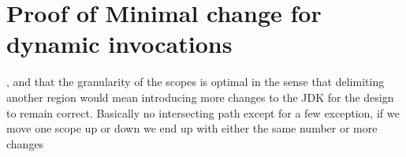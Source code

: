 \chapter{Proof of Minimal change for dynamic invocations}\label{minimal_change}
, and that the granularity of the scopes is optimal in the sense that delimiting another region would mean introducing more changes to the JDK for the design to remain correct.
Basically no intersecting path except for a few exception, if we move one scope up or down we end up with either the same number or more changes
